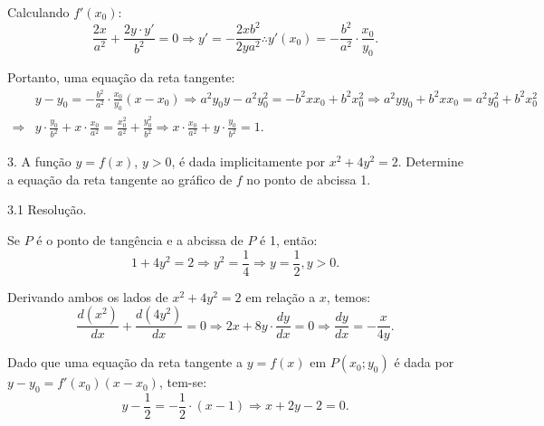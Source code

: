 \documentclass{article}
\begin{document}
{\begin{newpage}
\par Calculando $f'(x_0)$:
\begin{equation*} \displaystyle{\frac{2x}{a^2} + \frac{2y\cdot y'}{b^2} = 0 \Rightarrow y'=-\frac{2xb^2}{2ya^2} \therefore y'(x_0) = -\frac{b^2}{a^2}\cdot\frac{x_0}{y_0}} .\end{equation*}
\par Portanto, uma equação da reta tangente:
\begin{equation*} \displaystyle{\begin{split} &y - y_0 = -\frac{b^2}{a^2}\cdot\frac{x_0}{y_0}(x-x_0) \Rightarrow a^{2}y_{0}y - a^{2}y_{0}^{2} = -b^{2}xx_0 + b^{2}x_{0}^{2} \Rightarrow a^{2}yy_0 + b^{2}xx_0 = a^{2}y_{0}^{2} + b^{2}x_{0}^{2} \\ \Rightarrow &y\cdot\frac{y_0}{b^2} + x\cdot\frac{x_0}{a^2} = \frac{x_{0}^{2}}{a^2} + \frac{y_{0}^{2}}{b^2} \Rightarrow x\cdot\frac{x_0}{a^2} + y\cdot\frac{y_0}{b^2} = 1.\end{split} } \end{equation*}
\par
\vspace{0.3cm}
\begin{flushleft}
3. A função $y=f(x)$, $y>0$, é dada implicitamente por $x^2 + 4y^2 = 2$. Determine a equação da reta tangente ao gráfico de $f$ no ponto de abcissa 1.
\end{flushleft}
\par
\vspace{0.3cm}
\begin{flushleft}
3.1 Resolução.
\end{flushleft}
\par Se $P$ é o ponto de tangência e a abcissa de $P$ é 1, então:
\begin{equation*} 1 + 4y^2 = 2 \Rightarrow y^2 = \displaystyle{\frac{1}{4} \Rightarrow y=\frac{1}{2}, y>0.} \end{equation*}
\par Derivando ambos os lados de $x^2 + 4y^2 = 2$ em relação a $x$, temos:
\begin{equation*} \displaystyle{\frac{d(x^2)}{dx} + \frac{d(4y^2)}{dx} = 0 \Rightarrow 2x + 8y\cdot\frac{dy}{dx} = 0 \Rightarrow \frac{dy}{dx} = -\frac{x}{4y}} .\end{equation*}
\par Dado que uma equação da reta tangente a $y=f(x)$ em $P(x_0;y_0)$ é dada por $y - y_0 = f'(x_0)(x - x_0)$, tem-se:
\begin{equation*} \displaystyle{y - \frac{1}{2} = -\frac{1}{2}\cdot (x-1) \Rightarrow x + 2y - 2 = 0} .\end{equation*}

\end{newpage}}
\end{document}
